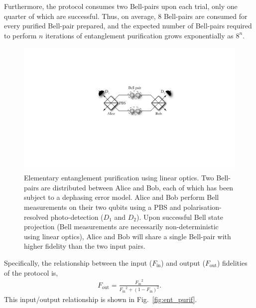 \documentclass[aps,rmp,twocolumn,amsmath,amssymb,nofootinbib,superscriptaddress,longbibliography,floatfix,table-of-contents,eqsecnum]{revtex4-1}
\begin{document}
Furthermore, the protocol consumes two Bell-pairs upon each trial, only one quarter of which are successful. Thus, on average, 8 Bell-pairs are consumed for every purified Bell-pair prepared, and the expected number of Bell-pairs required to perform $n$ iterations of entanglement purification grows exponentially as $8^n$.

\begin{figure}[!htb]
\includegraphics[width=0.9\columnwidth]{ent_purif_prot}
\caption{Elementary entanglement purification using linear optics. Two Bell-pairs are distributed between Alice and Bob, each of which has been subject to a dephasing error model. Alice and Bob perform Bell measurements on their two qubits using a PBS and polarisation-resolved photo-detection ($D_1$ and $D_2$). Upon successful Bell state projection (Bell measurements are necessarily non-deterministic using linear optics), Alice and Bob will share a single Bell-pair with higher fidelity than the two input pairs.} \label{fig:ent_purif_prot}
\end{figure}

Specifically, the relationship between the input ($F_\text{in}$) and output ($F_\text{out}$) fidelities of the protocol is,
\begin{align}
F_\text{out} = \frac{{F_\text{in}}^2}{{F_\text{in}}^2 + (1-F_\text{in})^2}.
\end{align}
This input/output relationship is shown in Fig.~\ref{fig:ent_purif}.
\end{document}
